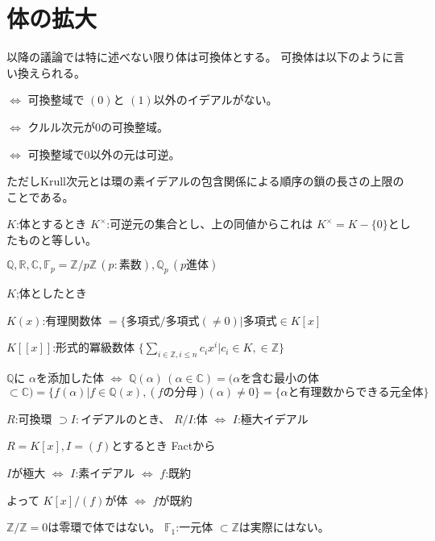\documentclass[../master_galois_theory]{subfiles}
\begin{document}
\setcounter{section}{0}

\section{体の拡大}

以降の議論では特に述べない限り体は可換体とする。
可換体は以下のように言い換えられる。

$\Leftrightarrow$ 可換整域で $(0)$と $(1)$以外のイデアルがない。

$\Leftrightarrow$ クルル次元が0の可換整域。

$\Leftrightarrow$ 可換整域で0以外の元は可逆。

ただしKrull次元とは環の素イデアルの包含関係による順序の鎖の長さの上限のことである。

$K$:体とするとき $K^\times$:可逆元の集合とし、上の同値からこれは $K^\times = K - \{ 0 \}$としたものと等しい。

\begin{exam}
  $\mathbb{Q}, \mathbb{R}, \mathbb{C}, \mathbb{F}_p = \mathbb{Z}/p\mathbb{Z} \, (p:素数), \mathbb{Q}_p \, (p進体)$
\end{exam}

\begin{exam}
  $K$;体としたとき

  $K(x)$:有理関数体 $= \{ 多項式 / 多項式(\neq 0) | 多項式 \in K[x]$

  $K[[x]]$:形式的冪級数体 $\{ \sum_{i \in \mathbb{Z} , i \leq n} c_i x^i | c_i \in K , \in \mathbb{Z} \}$

  $\mathbb{Q}$に $\alpha$を添加した体 $\Leftrightarrow$
  $\mathbb{Q}(\alpha) \, (\alpha \in \mathbb{C})
  = (\alpha$を含む最小の体 $\subset \mathbb{C})
  = \{ f(\alpha) | f \in \mathbb{Q}(x) , (fの分母)(\alpha) \neq 0 \}
  = \{ \alpha と有理数からできる元全体 \}$
\end{exam}

\begin{fact}
  $R$:可換環 $\supset I : イデアル$のとき、
  $R/I$:体 $\Leftrightarrow$ $I$:極大イデアル
\end{fact}

\begin{exam}
  $R = K[x] , I = (f)$とするとき Factから

  $I$が極大 $\Leftrightarrow$ $I$:素イデアル $\Leftrightarrow$ $f$:既約

  よって $K[x]/(f)$が体 $\Leftrightarrow$ $f$が既約
\end{exam}

\begin{rem}
  $\mathbb{Z}/\mathbb{Z} = 0$は零環で体ではない。
  $\mathbb{F}_1$:一元体 $\subset \mathbb{Z}$は実際にはない。
\end{rem}
\end{document}
